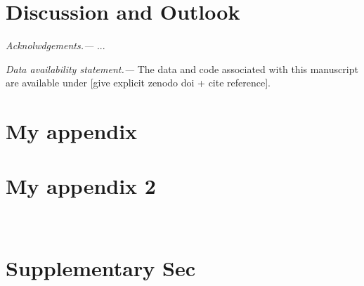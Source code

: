 \documentclass[
aps,
prx,
showpacs,
preprintnumbers,
twocolumn,
superscriptaddress,
10pt,
]{revtex4-2}
\newcommand*{\nqdcolor}{\color{nqdcolor}}
\let\origcontentsline\addcontentsline
\newcommand\resumetoc{\let\addcontentsline\origcontentsline}
\begin{document}
\section{Discussion and Outlook}

\textit{Acknolwdgements.---}%
...

\textit{Data availability statement.---}%
The data and code associated with this manuscript are available under [give explicit zenodo doi + cite reference].

\begin{appendix}

\section{My appendix}

\section{My appendix 2}

\end{appendix}

\else %
\fi %

\resumetoc
\ifsuppmode

\cleardoublepage



\renewcommand{\thefigure}{S\arabic{figure}}
\setcounter{figure}{0}
\renewcommand{\theequation}{S.\arabic{equation}}
\setcounter{equation}{0}
\renewcommand{\thesection}{S\arabic{section}}
\setcounter{section}{0}


\onecolumngrid
\begin{center}
	\textbf{\large{\textit{\nqdcolor{Supplemental Material}}}}\\
	\hfill \break
\end{center}
\twocolumngrid

\ifcombinedmode
\else
\maketitle
\fi %

\tableofcontents

\section{Supplementary Sec}
\end{document}

